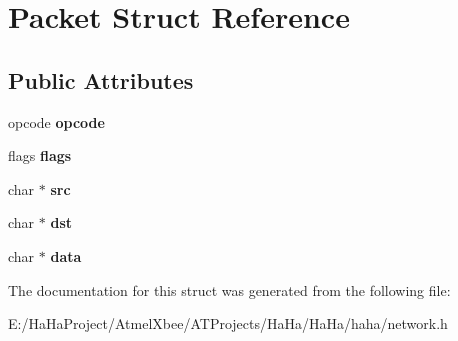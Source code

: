 \hypertarget{struct_packet}{}\section{Packet Struct Reference}
\label{struct_packet}
\subsection*{Public Attributes}
\begin{DoxyCompactItemize}
\item 
\mbox{\label{struct_packet_add7e8d0db5c932cdf6ff0252697b88b0}} 
opcode {\bfseries opcode}
\item 
\mbox{\label{struct_packet_a06b33fa705a08bf26d8f15f4e5a5eacc}} 
flags {\bfseries flags}
\item 
\mbox{\label{struct_packet_abd4ca96c59b8446f7fb688c489e8b53f}} 
char $\ast$ {\bfseries src}
\item 
\mbox{\label{struct_packet_ac190cf6efc3180c1167886410748f1b9}} 
char $\ast$ {\bfseries dst}
\item 
\mbox{\label{struct_packet_a6ce50b69127890b9012cb91f287f137f}} 
char $\ast$ {\bfseries data}
\end{DoxyCompactItemize}


The documentation for this struct was generated from the following file\+:\begin{DoxyCompactItemize}
\item 
E\+:/\+Ha\+Ha\+Project/\+Atmel\+Xbee/\+A\+T\+Projects/\+Ha\+Ha/\+Ha\+Ha/haha/network.\+h\end{DoxyCompactItemize}
